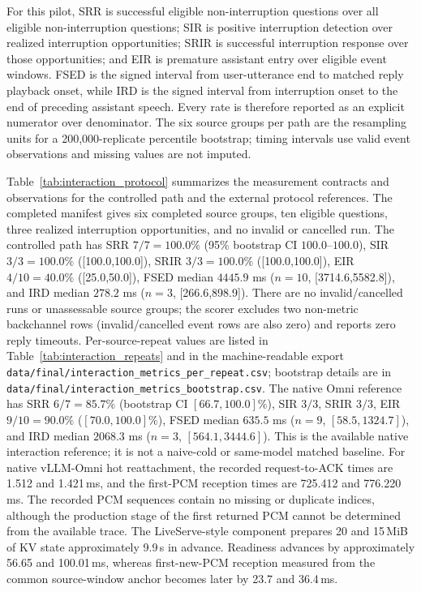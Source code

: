 \documentclass{article}
\begin{document}
For this pilot, SRR is successful eligible non-interruption questions over
all eligible non-interruption questions; SIR is positive interruption
detection over realized interruption opportunities; SRIR is successful
interruption response over those opportunities; and EIR is premature
assistant entry over eligible event windows. FSED is the signed interval
from user-utterance end to matched reply playback onset, while IRD is the
signed interval from interruption onset to the end of preceding assistant
speech. Every rate is therefore reported as an explicit numerator over
denominator. The six source groups per path are the resampling units for a
200,000-replicate percentile bootstrap; timing intervals use valid event
observations and missing values are not imputed.

Table~\ref{tab:interaction_protocol} summarizes the measurement
contracts and observations for the controlled path and the external
protocol references. The completed manifest gives six completed source
groups, ten eligible questions, three realized interruption opportunities,
and no invalid or cancelled run. The controlled path has SRR $7/7=100.0\%$
(95\% bootstrap CI $100.0$--$100.0$), SIR $3/3=100.0\%$ ([100.0,100.0]),
SRIR $3/3=100.0\%$ ([100.0,100.0]), EIR $4/10=40.0\%$ ([25.0,50.0]),
FSED median $4445.9$ ms ($n=10$, [3714.6,5582.8]), and IRD median
$278.2$ ms ($n=3$, [266.6,898.9]). There are no invalid/cancelled runs
or unassessable source groups; the scorer excludes two non-metric
backchannel rows (invalid/cancelled event rows are also zero) and reports
zero reply timeouts. Per-source-repeat values
are listed in Table~\ref{tab:interaction_repeats} and in the
machine-readable export \texttt{data/final/interaction\_metrics\_per\_repeat.csv};
bootstrap details are in \texttt{data/final/interaction\_metrics\_bootstrap.csv}.
The native Omni reference has SRR $6/7=85.7\%$ (bootstrap CI
$[66.7,100.0]\%$), SIR $3/3$, SRIR $3/3$, EIR $9/10=90.0\%$
($[70.0,100.0]\%$), FSED median $635.5$ ms ($n=9$,
$[58.5,1324.7]$), and IRD median $2068.3$ ms ($n=3$,
$[564.1,3444.6]$). This is the available native interaction reference;
it is not a naive-cold or same-model matched baseline.
For native
vLLM-Omni hot reattachment, the recorded request-to-ACK times are
1.512 and 1.421\,ms, and the first-PCM reception times are 725.412 and
776.220\,ms. The recorded PCM sequences contain no missing or duplicate
indices, although the production stage of the first returned PCM cannot
be determined from the available trace. The LiveServe-style component
prepares 20 and 15\,MiB of KV state approximately 9.9\,s in advance.
Readiness advances by approximately 56.65 and 100.01\,ms, whereas
first-new-PCM reception measured from the common source-window anchor
becomes later by 23.7 and 36.4\,ms.
\end{document}
